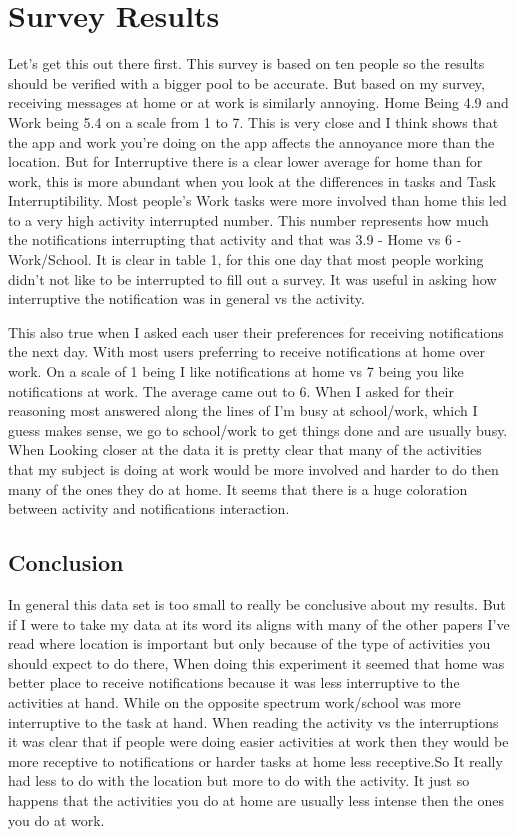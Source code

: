 \documentclass{vgtc}                          %
\begin{document}
\section{Survey Results}

Let's get this out there first. This survey is based on ten people so the results should be verified with a bigger pool to be accurate. But based on my survey, receiving messages at home or at work is similarly annoying. Home Being 4.9 and Work being 5.4 on a scale from 1 to 7. This is very close and I think shows that the app and work you're doing on the app affects the annoyance more than the location. But for Interruptive there is a clear lower average for home than for work, this is more abundant when you look at the differences in tasks and Task Interruptibility. Most people's Work tasks were more involved than home this led to a very high activity interrupted number. This number represents how much the notifications interrupting that activity and that was 3.9 - Home vs 6 - Work/School. It is clear in table 1, for this one day that most people working didn't not like to be interrupted to fill out a survey. It was useful in asking how interruptive the notification was in general vs the activity. 


 This also true when I asked each user their preferences for receiving notifications the next day.  With most users preferring to receive notifications at home over work. On a scale of 1 being I like notifications at home vs 7 being you like notifications at work. The average came out to 6. When I asked for their reasoning most answered along the lines of I’m busy at school/work, which I guess makes sense, we go to school/work to get things done and are usually busy. When Looking closer at the data it is pretty clear that many of the activities that my subject is doing at work would be more involved and harder to do then many of the ones they do at home. 
It seems that there is a huge coloration between activity and notifications interaction. 

\subsection{Conclusion}

In general this data set is too small to really be conclusive about my results. But if I were to take my data at its word its aligns with many of the other papers I’ve read where location is important but only because of the type of activities you should expect to do there, When doing this experiment it seemed that home was better place to receive notifications because it was less interruptive to the activities at hand. While on the opposite spectrum work/school was more interruptive to the task at hand. When reading the activity vs the interruptions it was clear that if people were doing easier activities at work then they would be more receptive to notifications or harder tasks at home less receptive.So It really had less to do with the location but more to do with the activity. It just so happens that the activities you do at home are usually less intense then the ones you do at work.
\end{document}
